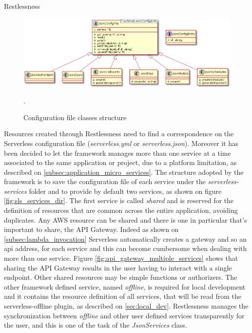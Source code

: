 \begin{chapter}{Restlessness}
    \begin{figure}
        \centering
        \includegraphics[width=\linewidth]{source/diagrams/rln_config_files.png}
        \caption{Configuration file classes structure}
        \label{fig:rln_json_config_file}.
    \end{figure}

    Resources created through Restlessness need to find a correspondence on the
    Serverless configuration file (\textit{serverless.yml} or \textit{serverless.json}).
    Moreover it has been decided to let the framework manages more than one service at
    a time associated to the same application or project, due to a platform limitation,
    as described on \ref{subsec:application_micro_services}.
    The structure adopted by the framework is to save the configuration file of
    each service under the \textit{serverless-services} folder and to provide by
    default two services, as shown on figure \ref{fig:sls_services_dir}.
    The first service is called \textit{shared} and is reserved for the definition
    of resources that are common across the entire application, avoiding duplicates.
    Any AWS resource can be shared and there is one in particular that's important
    to share, the API Gateway. Indeed as shown on \ref{subsec:lambda_invocation}
    Serverless automatically creates a gateway and so an api address, for each
    service and this can become cumbersome when dealing with more than one service.
    Figure \ref{fig:api_gateway_multiple_services} shows that sharing the API
    Gateway results in the user having to interact with a single endpoint.
    Other shared resources may be simple functions or authorizers.
    The other framework defined service, named \textit{offline}, is required for
    local development and it contains the resource definition of all services,
    that will be read from the serverless-offline plugin, as described on
    \ref{sec:local_dev}. Restlessness manages the synchronization between
    \textit{offline} and other user defined services transparently for the user,
    and this is one of the task of the \textit{JsonServices} class.


\end{chapter}
